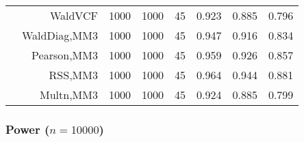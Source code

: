 \documentclass[
]{article}
\begin{document}
\begin{table}[H]
{\begin{tabular}[t]{lrrrrrrr}
\hspace{1em} & WaldVCF & 1000 & 1000 & 45 & 0.923 & 0.885 & 0.796\\

\hspace{1em} & WaldDiag,MM3 & 1000 & 1000 & 45 & 0.947 & 0.916 & 0.834\\

\hspace{1em} & Pearson,MM3 & 1000 & 1000 & 45 & 0.959 & 0.926 & 0.857\\

\hspace{1em} & RSS,MM3 & 1000 & 1000 & 45 & 0.964 & 0.944 & 0.881\\

\hspace{1em} & Multn,MM3 & 1000 & 1000 & 45 & 0.924 & 0.885 & 0.799\\
\bottomrule
\end{tabular}}
\endgroup{}
\end{table}

\subsubsection{\texorpdfstring{Power
(\(n=10000\))}{Power (n=10000)}}\label{power-n10000}
\end{document}
